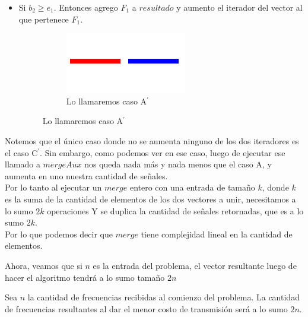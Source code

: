 \begin{itemize}
\begin{itemize}
            \item Si $b_{2} \geq e_{1}$. Entonces agrego $F_{1}$ a $resultado$ y aumento el iterador del vector al que pertenece $F_{1}$.
            \begin{figure}[H]
        		\centering
				\begin{subfigure}[b]{0.25\textwidth}
                	\includegraphics[width=\textwidth]{imagenes/ej2-a2.jpg}
                	\caption*{Lo llamaremos caso A$^{\prime}$}
        		\end{subfigure}%
			\end{figure}
        \end{itemize}

        Notemos que el único caso donde no se aumenta ninguno de los dos iteradores es el caso C$^{\prime}$. Sin embargo, como podemos ver en ese caso, luego de ejecutar ese llamado a $mergeAux$ nos queda nada más y nada menos que el caso A, y aumenta en uno nuestra cantidad de señales. \\ 
Por lo tanto al ejecutar un $merge$ entero con una entrada de tamaño $k$, donde $k$ es la suma de la cantidad de elementos de los dos vectores a unir, necesitamos a lo sumo $2k$ operaciones  Y se duplica la cantidad de señales retornadas, que es a lo sumo $2k$.\\ 

Por lo que podemos decir que $merge$ tiene complejidad lineal en la cantidad de elementos. \\

\end{itemize}

Ahora, veamos que si $n$ es la entrada del problema, el vector resultante luego de hacer el algoritmo tendrá a lo sumo tamaño $2n$
\begin{lemma}
Sea $n$ la cantidad de frecuencias recibidas al comienzo del problema. La cantidad de frecuencias resultantes al dar el menor costo de transmisión será a lo sumo $2n$.
\end{lemma}

